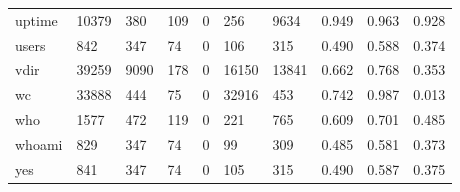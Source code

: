 \begin{longtable}{lp{2.0cm}p{2.0cm}p{2.0cm}p{2.0cm}p{2.0cm}p{2.0cm}p{2.0cm}p{2.0cm}p{2.0cm}}
uptime    &                  10379 &                                380 &                               109 &                                0 &                               256 &                            9634 &                                   0.949 &                                  0.963 &                                0.928 \\
users     &                    842 &                                347 &                                74 &                                0 &                               106 &                             315 &                                   0.490 &                                  0.588 &                                0.374 \\
vdir      &                  39259 &                               9090 &                               178 &                                0 &                             16150 &                           13841 &                                   0.662 &                                  0.768 &                                0.353 \\
wc        &                  33888 &                                444 &                                75 &                                0 &                             32916 &                             453 &                                   0.742 &                                  0.987 &                                0.013 \\
who       &                   1577 &                                472 &                               119 &                                0 &                               221 &                             765 &                                   0.609 &                                  0.701 &                                0.485 \\
whoami    &                    829 &                                347 &                                74 &                                0 &                                99 &                             309 &                                   0.485 &                                  0.581 &                                0.373 \\
yes       &                    841 &                                347 &                                74 &                                0 &                               105 &                             315 &                                   0.490 &                                  0.587 &                                0.375 \\
\end{longtable}
